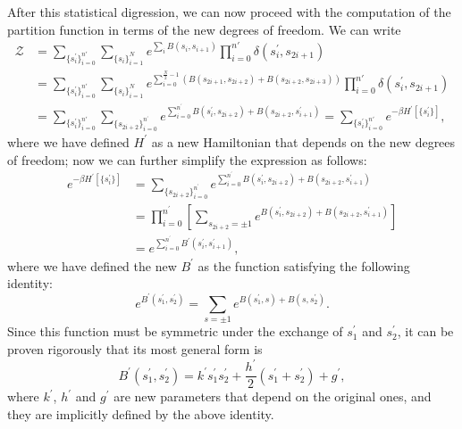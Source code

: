 After this statistical digression, we can now proceed with the computation of the partition function in terms of the new degrees of freedom. We can write
\[
    \begin{aligned}
        \mathcal{Z} & = \sum_{\{s^{\prime}_i\}_{i=0}^{n'}} \sum_{\{s_i\}_{i=1}^N} e^{\sum_{i} B(s_{i}, s_{i+1})} \prod_{i=0}^{n'} \delta(s_i^{\prime}, s_{2i+1})                                                                                                      \\
                    & = \sum_{\{s^{\prime}_i\}_{i=0}^{n'}} \sum_{\{s_i\}_{i=1}^N} e^{ \sum_{i=0}^{\frac{N}{2}-1} \left( B(s_{2i+1}, s_{2i+2}) + B(s_{2i+2}, s_{2i+3}) \right) } \prod_{i=0}^{n'} \delta(s_i^{\prime}, s_{2i+1})                                       \\
                    & = \sum_{\{s^{\prime}_i\}_{i=0}^{n'}} \sum_{\{s_{2i+2}\}_{i=0}^{n^{\prime}}} e^{\sum_{i=0}^{n^{\prime}} B(s_i^{\prime}, s_{2i+2}) + B(s_{2i+2}, s_{i+1}^{\prime})} = \sum_{\{s^{\prime}_i\}_{i=0}^{n'}} e^{-\beta H^{\prime}[\{s_i^{\prime}\}]},
    \end{aligned}
\]
where we have defined \(H^{\prime}\) as a new Hamiltonian that depends on the new degrees of freedom; now we can further simplify the expression as follows:
\[
    \begin{aligned}
        e^{-\beta H^{\prime}[\{s_i^{\prime}\}]} & = \sum_{\{s_{2i+2}\}_{i=0}^{n^{\prime}}} e^{\sum_{i=0}^{n^{\prime}} B(s_i^{\prime}, s_{2i+2}) + B(s_{2i+2}, s_{i+1}^{\prime})}  \\
                                                & = \prod_{i=0}^{n^{\prime}} \left[ \sum_{s_{2i+2} = \pm 1} e^{B(s_i^{\prime}, s_{2i+2}) + B(s_{2i+2}, s_{i+1}^{\prime})} \right] \\
                                                & = e^{\sum_{i=0}^{n^{\prime}} B^{\prime} (s_i^{\prime}, s_{i+1}^{\prime})},
    \end{aligned}
\]
where we have defined the new \(B^{\prime}\) as the function satisfying the following identity:
\[
    e^{B^{\prime} (s_1^{\prime}, s_2^{\prime})} = \sum_{s = \pm 1} e^{B(s_1^{\prime}, s) + B(s, s_2^{\prime})}.
\]
Since this function must be symmetric under the exchange of \(s_1^{\prime}\) and \(s_2^{\prime}\), it can be proven rigorously that its most general form is
\[
    B^{\prime} (s_1^{\prime}, s_2^{\prime}) = k^{\prime} s_1^{\prime} s_2^{\prime} + \frac{h^{\prime}}{2} (s_1^{\prime} + s_2^{\prime}) + g^{\prime},
\]
where \(k^{\prime}\), \(h^{\prime}\) and \(g^{\prime}\) are new parameters that depend on the original ones, and they are implicitly defined by the above identity.

